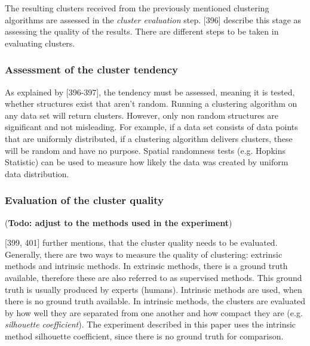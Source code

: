 The resulting clusters received from the previously mentioned clustering algorithms are assessed in the \textit{cluster evaluation} step. \textcite{han2011data}[396] describe this stage as assessing the quality of the results.
There are different steps to be taken in evaluating clusters. 
 
  \subsubsection{Assessment of the cluster tendency}
  As explained by \textcite{han2011data}[396-397], the tendency must be assessed, meaning it is tested, whether structures exist that aren't random. Running a clustering algorithm on any data set will return clusters. However, only non random structures are significant and not misleading. For example, if a data set consists of data points that are uniformly distributed, if a clustering algorithm delivers clusters, these will be random and have no purpose. Spatial randomness tests (e.g. Hopkins Statistic) can be used to measure how likely the data was created by uniform data distribution.

 

  \subsubsection{Evaluation of the cluster quality}
  (\textbf{Todo: adjust to the methods used in the experiment})

  \textcite{han2011data}[399, 401] further mentions, that the cluster quality needs to be evaluated. Generally, there are two ways to measure the quality of clustering: extrinsic methods and intrinsic methods. In extrinsic methods, there is a ground truth available, therefore these are also referred to as supervised methods. This ground truth is usually produced by experts (humans). Intrinsic methods are used, when there is no ground truth available. In intrinsic methods, the clusters are evaluated by how well they are separated from one another and how compact they are (e.g. \textit{silhouette coefficient}).
  The experiment described in this paper uses the intrinsic method silhouette coefficient, since there is no ground truth for comparison.
  
  
